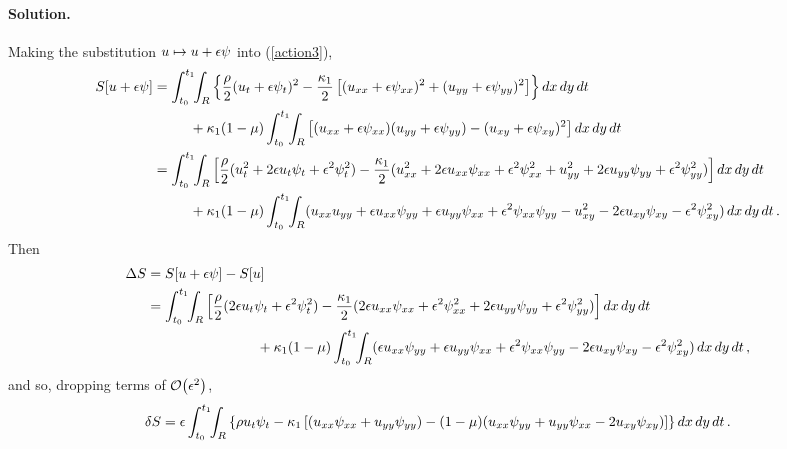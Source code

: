 \documentclass[11pt]{article}
\newcommand{\refeq}[1]{(\ref{#1})}
\newcommand{\beqn}{\begin{equation}}
\newcommand{\eeqn}{\end{equation}}
\newenvironment{solution}
{
    \paragraph{Solution.}
    \ignorespaces
}
{
}
\begin{document}
\begin{solution}
	Making the substitution $u \mapsto u + \epsilon \psi$ into \refeq{action3},
	\begin{align*}
		S[u + \eps \psi] &= \inttr \left\{ \frac{\rho}{2} (\ut + \eps \psit)^2 - \frac{\kaq}{2} \left[ (\uxx + \eps \psixx)^2 + (\uyy + \eps \psiyy)^2 \right] \right\} \drt \\
		&\phantom{mmm} + \kaq (1 - \mu) \inttr \left[ (\uxx + \eps \psixx) (\uyy + \eps \psiyy) - (\uxy + \eps \psixy)^2 \right] \drt \\
		&= \inttr \left[ \frac{\rho}{2} (\ut^2 + 2 \eps \ut \psit + \eps^2 \psit^2) - \frac{\kaq}{2} (\uxx^2 + 2 \eps \uxx \psixx + \eps^2 \psixx^2 + \uyy^2 + 2 \eps \uyy \psiyy + \eps^2 \psiyy^2) \right] \drt \\
		&\phantom{mmm} + \kaq (1 - \mu) \inttr (\uxx \uyy + \eps \uxx \psiyy + \eps \uyy \psixx + \eps^2 \psixx \psiyy - \uxy^2 - 2 \eps \uxy \psixy - \eps^2 \psixy^2 ) \drt.
	\end{align*}
	Then
	\begin{align*}
		\Delta S &= S[u + \epsilon \psi] - S[u] \\
		&=  \int_{t_0}^{t_1} \!\!\int_R \left[ \frac{\rho}{2} (2 \epsilon u_t \psi_t + \epsilon^2 \psi_t^2) - \frac{\kappa_1}{2} (2 \epsilon u_{xx} \psi_{xx} + \epsilon^2 \psi_{xx}^2 + 2 \epsilon u_{yy} \psi_{yy} + \epsilon^2 \psi_{yy}^2) \right] \dd{x} \dd{y} \dd{t} \\
		&\phantom{mmmmmmmmm} + \kappa_1 (1 - \mu) \int_{t_0}^{t_1} \!\!\int_R (\epsilon u_{xx} \psi_{yy} + \epsilon u_{yy} \psi_{xx} + \epsilon^2 \psi_{xx} \psi_{yy} - 2 \epsilon u_{xy} \psi_{xy} - \epsilon^2 \psi_{xy}^2 ) \dd{x} \dd{y} \dd{t},
	\end{align*}
	and so, dropping terms of $\order{\eps^2}$,
	\beqn \label{dS1}
		\dS = \eps \inttr \left\{ \rho \ut \psit - \kaq \left[ (\uxx \psixx + \uyy \psiyy) - (1 - \mu) (\uxx \psiyy + \uyy \psixx - 2 \uxy \psixy) \right] \right\} \drt.
	\eeqn
	

\end{solution}
\end{document}
